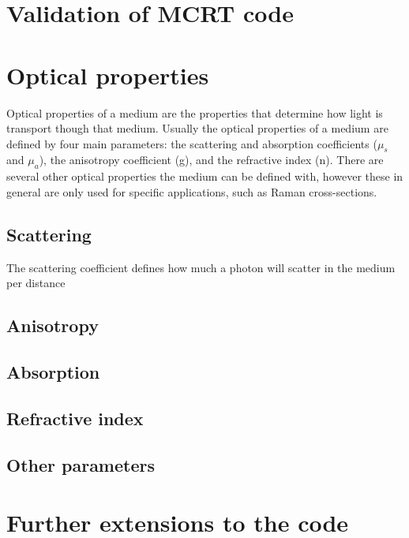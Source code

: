 \section{Validation of MCRT code}
\section{Optical properties}\label{sec:optprop}

Optical properties of a medium are the properties that determine how light is transport though that medium. Usually the optical properties of a medium are defined by four main parameters: the scattering and absorption coefficients ($\mu_s$ and $\mu_a$), the anisotropy coefficient (g), and the refractive index (n). There are several other optical properties the medium can be defined with, however these in general are only used for specific applications, such as Raman cross-sections.

\subsection{Scattering}

The scattering coefficient defines how much a photon will scatter in the medium per distance

\subsection{Anisotropy}

\subsection{Absorption}

\subsection{Refractive index}

\subsection{Other parameters}



\section{Further extensions to the code}\label{sec:codefurther}